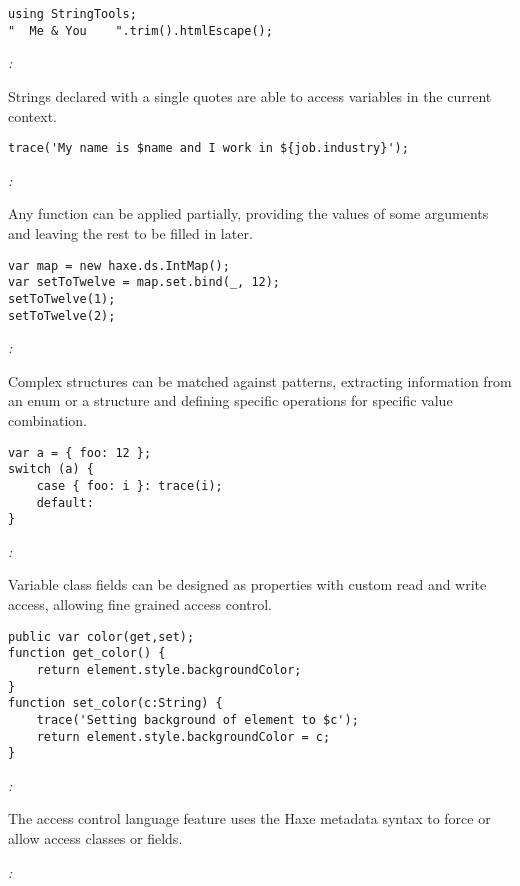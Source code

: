 \begin{lstlisting}
using StringTools;
"  Me & You    ".trim().htmlEscape();
\end{lstlisting}

\emph{:}

Strings declared with a single quotes are able to access variables in the current context.

\begin{lstlisting}
trace('My name is $name and I work in ${job.industry}');
\end{lstlisting}

\emph{:}

Any function can be applied partially, providing the values of some arguments and leaving the rest to be filled in later.

\begin{lstlisting}
var map = new haxe.ds.IntMap();
var setToTwelve = map.set.bind(_, 12);
setToTwelve(1);
setToTwelve(2);
\end{lstlisting}

\emph{:}

Complex structures can be matched against patterns, extracting information from an enum or a structure and defining specific operations for specific value combination.

\begin{lstlisting}
var a = { foo: 12 };
switch (a) {
    case { foo: i }: trace(i);
    default:
}
\end{lstlisting}

\emph{:}

Variable class fields can be designed as properties with custom read and write access, allowing fine grained access control.
\begin{lstlisting}
public var color(get,set);
function get_color() {
    return element.style.backgroundColor;
}
function set_color(c:String) {
    trace('Setting background of element to $c');
    return element.style.backgroundColor = c;
}
\end{lstlisting}

\emph{:}

The access control language feature uses the Haxe metadata syntax to force or allow access classes or fields.

\emph{:}

